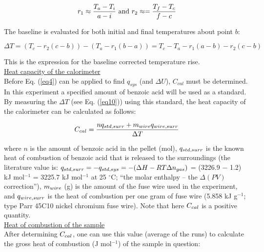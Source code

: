 \documentclass[byrevtex,amssymb,aps,pra,floatfix,letterpaper]{revtex4}
\begin{document}
\begin{equation}
\label{eq10}
r_1 \approx \frac{T_a - T_i}{a - i}\textnormal{ and } r_2 \approx = \frac{T_f - T_c}{f - c}
\end{equation}

\noindent
The baseline is evaluated for both initial and final temperatures about point $b$:

\begin{equation}
\label{eq11}
\Delta T = \left(T_c - r_2(c - b)\right) - \left(T_a - r_1(b - a)\right) = T_c - T_a - r_1(a - b) - r_2(c - b)
\end{equation}

\noindent
This is the expression for the baseline corrected temperature rise.\\

\noindent
\underline{Heat capacity of the calorimeter}\\

\noindent
Before Eq. (\ref{eq4}) can be applied to find $q_{sys}$ (and $\Delta U$), $C_{cal}$ must be determined. In this experiment a specified amount of benzoic acid will be used as a standard. By measuring the $\Delta T$ (see Eq. (\ref{eq10})) using this standard, the heat capacity of the calorimeter can be calculated as follows:

\begin{equation}
\label{eq12}
C_{cal} = \frac{nq_{\tiny std,surr} + m_{\tiny wire}q_{\tiny wire,surr}}{\Delta T}
\end{equation}

\noindent
where $n$ is the amount of benzoic acid in the pellet (mol), $q_{\tiny std,surr}$ is the known heat of combustion of benzoic acid that is released to the surroundings (the literature value \cite{ATKINS1} is: $q_{\tiny std,surr} = -q_{\tiny std,sys} = -(\Delta H - RT\Delta n_{\tiny gas})$ = (3226.9 $-$ 1.2) kJ mol$^{-1}$ = 3225.7 kJ mol$^{-1}$ at 25 $^{\circ}$C; ``the molar enthalpy -- the $\Delta (PV)$ correction''), $m_{\tiny wire}$ (g) is the amount of the fuse wire used in the experiment, and $q_{\tiny wire,surr}$ is the heat of combustion per one gram of fuse wire (5.858 kJ g$^{-1}$; type Parr 45C10 nickel chromium fuse wire). Note that here $C_{\tiny cal}$ is a positive quantity.\\

\noindent
\underline{Heat of combustion of the sample}\\

\noindent
After determining $C_{\tiny cal}$, one can use this value (average of the runs) to calculate the gross heat of combustion (J mol$^{-1}$) of the sample in question:
\end{document}
